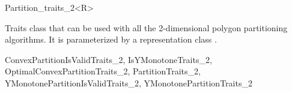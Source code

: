 

\begin{ccRefClass}{Partition_traits_2<R>}  %

\ccDefinition
  
Traits class that can be used with all the
2-dimensional polygon partitioning algorithms.  It is parameterized by
a representation class .


\ccIsModel

ConvexPartitionIsValidTraits\_2,
IsYMonotoneTraits\_2,
OptimalConvexPartitionTraits\_2,
PartitionTraits\_2,
YMonotonePartitionIsValidTraits\_2,
YMonotonePartitionTraits\_2

\ccTypes


\end{ccRefClass}

